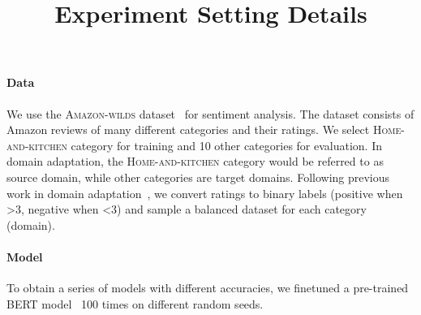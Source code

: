 \documentclass{article}
\title{Experiment Setting Details}
\date{}
\begin{document}
\maketitle





\paragraph{Data}
We use the \textsc{Amazon-wilds} dataset~\cite{pmlr-v139-WILDS} for sentiment analysis.
The dataset consists of Amazon reviews of many different categories and their ratings.
We select \textsc{Home-and-kitchen} category for training and 10 other categories for evaluation. 
In domain adaptation, the \textsc{Home-and-kitchen} category would be referred to as source domain, while other categories are target domains. 
Following previous work in domain adaptation~\cite{blitzer-etal-2007-biographies}, we convert ratings to binary labels (positive when >3, negative when <3) and sample a balanced dataset for each category (domain).

\paragraph{Model}
To obtain a series of models with different accuracies, we finetuned a pre-trained BERT model~\cite{bhargava2021generalization, DBLP:journals/corr/abs-1908-08962} 100 times on different random seeds.
\end{document}
